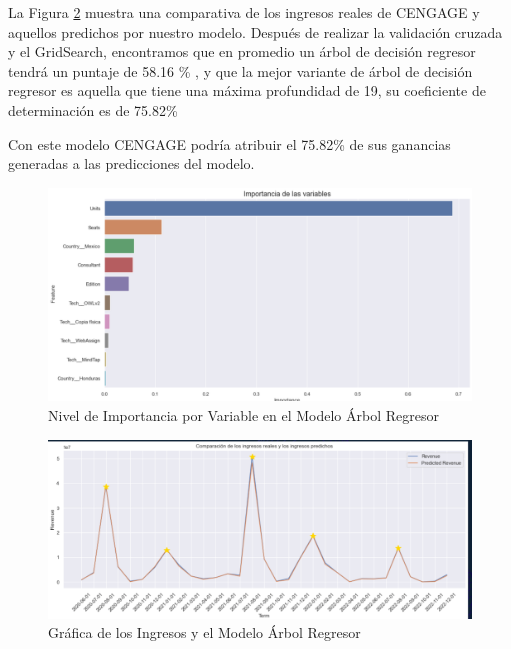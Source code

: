 \documentclass{article}
\begin{document}
        La Figura \ref{fig:model} muestra una comparativa de los ingresos reales de CENGAGE y aquellos predichos por nuestro modelo.
        Después de realizar la validación cruzada y el GridSearch, encontramos que en promedio un árbol de decisión regresor tendrá un puntaje de 58.16 \% , y que la mejor variante de árbol de decisión regresor es aquella que tiene una máxima profundidad de 19, su coeficiente de determinación es de 75.82\%
        
        Con este modelo CENGAGE podría atribuir el 75.82\% de sus ganancias generadas a las predicciones del modelo.
        
        \begin{figure}[h]
            \centering
            \includegraphics[width=\columnwidth]{img/variable_importance.png}
            \caption{Nivel de Importancia por Variable en el Modelo Árbol Regresor}
            \label{fig:importance}
        \end{figure}
        
        \begin{figure}
            \centering
            \includegraphics[width = \columnwidth]{img/model_predictions.png}
            \caption{Gráfica de los Ingresos y el Modelo Árbol Regresor}
            \label{fig:model}
        \end{figure}
\end{document}
